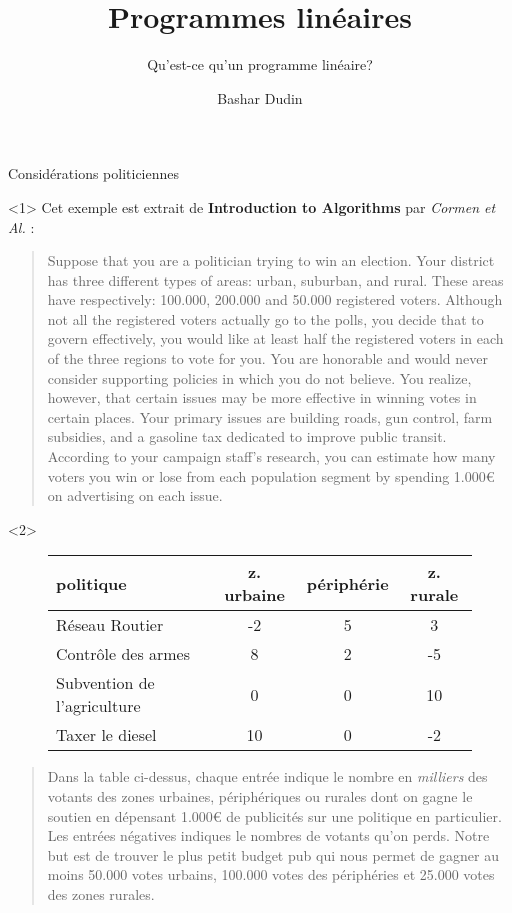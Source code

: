 \documentclass[aspectratio = 169]{beamer}
\author[BD]{Bashar Dudin}
\institute[]{EPITA}
\title{Programmes lin\'eaires} %
\subtitle{Qu'est-ce qu'un programme lin\'eaire?}
\begin{document}
\begin{frame}[plain]
\titlepage %
\end{frame}

\begin{frame}{Consid\'erations politiciennes}
  \begin{onlyenv}<1>
    Cet exemple est extrait de \textbf{Introduction to Algorithms}
    par \emph{Cormen et Al.} :
        \begin{quotation}
          Suppose that you are a politician trying to win an
          election. Your district has three different types of areas:
          urban, suburban, and rural. These areas have respectively:
          100.000, 200.000 and 50.000 registered voters. Although not
          all the registered voters actually go to the polls, you
          decide that to govern effectively, you would like at least
          half the registered voters in each of the three regions to
          vote for you. You are honorable and would never consider
          supporting policies in which you do not believe. You
          realize, however, that certain issues may be more effective
          in winning votes in certain places. Your primary issues are
          building roads, gun control, farm subsidies, and a gasoline
          tax dedicated to improve public transit. According to your
          campaign staff's research, you can estimate how many voters
          you win or lose from each population segment by spending
          1.000€ on advertising on each issue.
        \end{quotation}
    \end{onlyenv}
    \begin{onlyenv}<2>
        \begin{figure}
            \begin{tabular}{l|ccc}
                politique & z. urbaine & p\'eriph\'erie & z. rurale \\
                \hline
                R\'eseau Routier & -2 & 5 & 3 \\
                Contr\^ole des armes & 8 & 2 & -5 \\
                Subvention de l'agriculture & 0 & 0 & 10 \\
                Taxer le diesel & 10 & 0 & -2
            \end{tabular}
        \end{figure}
        \begin{quotation}
          Dans la table ci-dessus, chaque entr\'ee indique le nombre
          en \emph{milliers} des votants des zones urbaines,
          p\'eriph\'eriques ou rurales dont on gagne le soutien en
          d\'epensant 1.000€ de publicit\'es sur une politique en
          particulier. Les entr\'ees n\'egatives indiques le nombres
          de votants qu'on perds. Notre but est de trouver le plus
          petit budget pub qui nous permet de gagner au moins 50.000
          votes urbains, 100.000 votes des p\'eriph\'eries et 25.000
          votes des zones rurales.
        \end{quotation}
    \end{onlyenv}
\end{frame}
\end{document}
